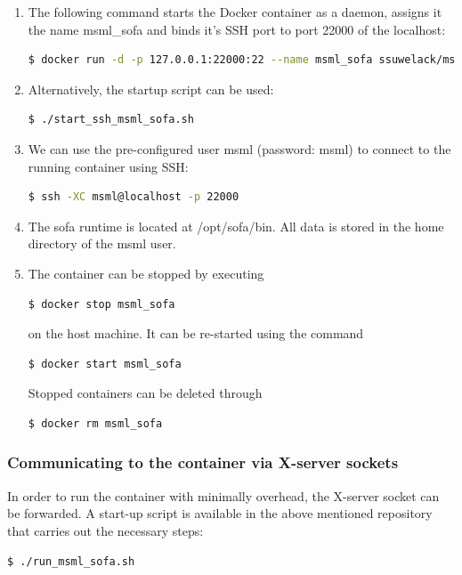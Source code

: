\begin{enumerate}
 \item The following command starts the Docker container as a daemon, assigns it the name msml\_sofa and binds it's SSH port to port 22000 of the localhost:
	\begin{lstlisting}[language=sh, breaklines=true]
  $ docker run -d -p 127.0.0.1:22000:22 --name msml_sofa ssuwelack/msml_sofa /root/start_ssh.sh 
\end{lstlisting}

\item Alternatively, the startup script can be used:
	\begin{lstlisting}[language=sh, breaklines=true]
  $ ./start_ssh_msml_sofa.sh
\end{lstlisting}

\item We can use the pre-configured user msml (password: msml) to connect to the running container using SSH:
	\begin{lstlisting}[language=sh]
  $ ssh -XC msml@localhost -p 22000
\end{lstlisting}

\item The sofa runtime is located at /opt/sofa/bin. All data is stored in the home directory of the msml user.

\item The container can be stopped by executing
\begin{lstlisting}[language=sh, breaklines=true]
  $ docker stop msml_sofa
\end{lstlisting}
on the host machine. It can be re-started using the command
\begin{lstlisting}[language=sh, breaklines=true]
  $ docker start msml_sofa
\end{lstlisting}
Stopped containers can be deleted through
\begin{lstlisting}[language=sh, breaklines=true]
  $ docker rm msml_sofa
\end{lstlisting}

\end{enumerate}

\subsubsection{Communicating to the container via X-server sockets}

In order to run the container with minimally overhead, the X-server socket can be forwarded. A start-up script is available in the above mentioned repository that carries out the necessary steps:
\begin{lstlisting}[language=sh, breaklines=true]
  $ ./run_msml_sofa.sh
\end{lstlisting}



